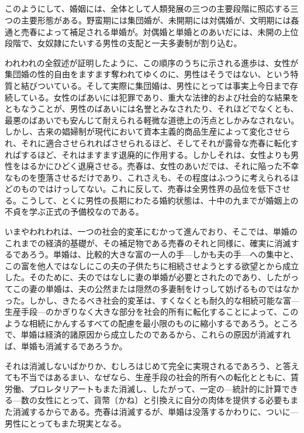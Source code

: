 \subsection*{}




このようにして、婚姻には、全体として人類発展の三つの主要段階に照応する三つの主要形態がある。野蛮期には集団婚が、未開期には対偶婚が、文明期には姦通と売春によって補足される単婚が。対偶婚と単婚とのあいだには、未開の上位段階で、女奴隷にたいする男性の支配と一夫多妻制が割り込む。

われわれの全叙述が証明したように、この順序のうちに示される進歩は、女性が集団婚の性的自由をますます奪われてゆくのに、男性はそうではない、という特質と結びついている。そして実際に集団婚は、男性にとっては事実上今日まで存続している。女性のばあいには犯罪であり、重大な法律的および社会的な結果をともなうことが、男性のばあいには名誉とみなされたり、それほどでなくとも、最悪のばあいでも安んじて耐えられる軽微な道徳上の汚点としかみなされない。しかし、古来の娼婦制が現代において資本主義的商品生産によって変化させられ、それに適合させられればさせられるほど、そしてそれが露骨な売春に転化すればするほど、それはますます退廃的に作用する。しかしそれは、女性よりも男性をはるかにひどく退廃させる。売春は、女性のあいだでは、それに陥った不幸なものを堕落させるだけであり、これさえも、その程度はふつうに考えられるほどのものではけっしてない。これに反して、売春は全男性界の品位を低下させる。こうして、とくに男性の長期にわたる婚約状態は、十中の九までが婚姻上の不貞を学ぶ正式の予備校なのである。

いまやわれわれは、一つの社会的変革にむかって進んでおり、そこでは、単婚のこれまでの経済的基礎が、その補足物である売春のそれと同様に、確実に消滅するであろう。単婚は、比較的大きな富の一人の手{\——}しかも夫の手{\——}への集中と、この富を他人ではなしにこの夫の子供たちに相続させようとする欲望とから成立した。そのために、夫のではなしに妻の単婚が必要とされたのであり、したがってこの妻の単婚は、夫の公然または隠然の多妻制をけっして妨げるものではなかった。しかし、きたるべき社会的変革は、すくなくとも耐久的な相続可能な富{\——}生産手段{\——}のかぎりなく大きな部分を社会的所有に転化することによって、このような相続にかんするすべての配慮を最小限のものに縮小するであろう。ところで、単婚は経済的諸原因から成立したのであるから、これらの原因が消滅すれば、単婚も消滅するであろうか。

それは消滅しないばかりか、むしろはじめて完全に実現されるであろう、と答えても不当ではあるまい、なぜなら、生産手段の社会的所有への転化とともに、賃労働、プロレタリアートもまた消滅し、したがって、一定の{\——}統計的に計算できる{\——}数の女性にとって、貨幣〔かね〕と引換えに自分の肉体を提供する必要もまた消滅するからである。売春は消滅するが、単婚は没落するかわりに、ついに{\——}男性にとってもまた現実となる。

